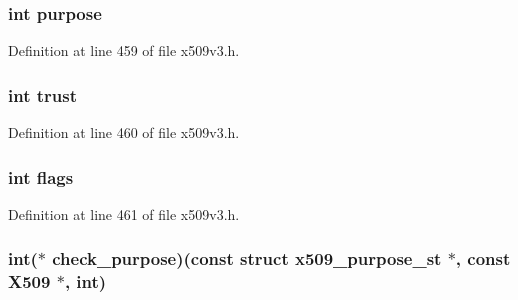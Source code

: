 \subsubsection[{\texorpdfstring{purpose}{purpose}}]{\setlength{\rightskip}{0pt plus 5cm}int purpose}\hypertarget{structx509__purpose__st_aea60aa19f747b78afd1139e406a352f2}{}\label{structx509__purpose__st_aea60aa19f747b78afd1139e406a352f2}


Definition at line 459 of file x509v3.\+h.

\subsubsection[{\texorpdfstring{trust}{trust}}]{\setlength{\rightskip}{0pt plus 5cm}int trust}\hypertarget{structx509__purpose__st_afd5c82d38ea055842dd3ab04fd2e316e}{}\label{structx509__purpose__st_afd5c82d38ea055842dd3ab04fd2e316e}


Definition at line 460 of file x509v3.\+h.

\subsubsection[{\texorpdfstring{flags}{flags}}]{\setlength{\rightskip}{0pt plus 5cm}int flags}\hypertarget{structx509__purpose__st_ac8bf36fe0577cba66bccda3a6f7e80a4}{}\label{structx509__purpose__st_ac8bf36fe0577cba66bccda3a6f7e80a4}


Definition at line 461 of file x509v3.\+h.

\subsubsection[{\texorpdfstring{check\+\_\+purpose}{check_purpose}}]{\setlength{\rightskip}{0pt plus 5cm}int($\ast$ check\+\_\+purpose)(const struct {\bf x509\+\_\+purpose\+\_\+st} $\ast$, const {\bf X509} $\ast$, int)}\hypertarget{structx509__purpose__st_a9371a2365586724be07671cc31d70a44}{}\label{structx509__purpose__st_a9371a2365586724be07671cc31d70a44}


